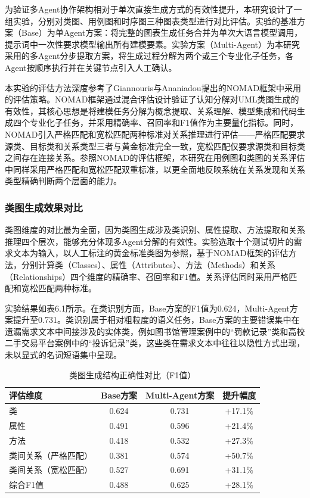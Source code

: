 为验证多Agent协作架构相对于单次直接生成方式的有效性提升，本研究设计了一组实验，分别对类图、用例图和时序图三种图表类型进行对比评估。实验的基准方案（Base）为单Agent方案：将完整的图表生成任务合并为单次大语言模型调用，提示词中一次性要求模型输出所有建模要素。实验方案（Multi-Agent）为本研究采用的多Agent分步提取方案，将生成过程分解为两个或三个专业化子任务，各Agent按顺序执行并在关键节点引入人工确认。

本实验的评估方法深度参考了Giannouris与Ananiadou提出的NOMAD框架\cite{giannouris2025nomad}中采用的评估策略。NOMAD框架通过混合评估设计验证了认知分解对UML类图生成的有效性，其核心思想是将建模任务分解为概念提取、关系理解、模型集成和代码生成四个专业化子任务，并采用精确率、召回率和F1值作为主要量化指标。同时，NOMAD引入严格匹配和宽松匹配两种标准对关系推理进行评估——严格匹配要求源类、目标类和关系类型三者与黄金标准完全一致，宽松匹配仅要求源类和目标类之间存在连接关系。参照NOMAD的评估框架，本研究在用例图和类图的关系评估中同样采用严格匹配和宽松匹配双重标准，以更全面地反映系统在关系发现和关系类型精确判断两个层面的能力。

\subsubsection{类图生成效果对比}

类图维度的对比最为全面，因为类图生成涉及类识别、属性提取、方法提取和关系推理四个层次，能够充分体现多Agent分解的有效性。实验选取十个测试切片的需求文本为输入，以人工标注的黄金标准类图为参照，基于NOMAD框架的评估方法，分别计算类（Classes）、属性（Attributes）、方法（Methods）和关系（Relationships）四个维度的精确率、召回率和F1值。关系评估同时采用严格匹配和宽松匹配两种标准。

实验结果如表6.1所示。在类识别方面，Base方案的F1值为0.624，Multi-Agent方案提升至0.731。类识别属于相对粗粒度的语义任务，Base方案的主要错误集中在遗漏需求文本中间接涉及的实体类，例如图书馆管理案例中的“罚款记录”类和高校二手交易平台案例中的“投诉记录”类，这些类在需求文本中往往以隐性方式出现，未以显式的名词短语集中呈现。

\begin{table}[htbp]
    \centering
    \caption{类图生成结构正确性对比（F1值）}
    \label{tab:class_comparison}
    \begin{tabular}{lccc}
        \toprule
        评估维度 & Base方案 & Multi-Agent方案 & 提升幅度 \\
        \midrule
        类 & 0.624 & 0.731 & +17.1\% \\
        属性 & 0.491 & 0.596 & +21.4\% \\
        方法 & 0.418 & 0.532 & +27.3\% \\
        类间关系（严格匹配） & 0.381 & 0.574 & +50.7\% \\
        类间关系（宽松匹配） & 0.527 & 0.691 & +31.1\% \\
        综合F1值 & 0.488 & 0.625 & +28.1\% \\
        \bottomrule
    \end{tabular}
\end{table}

